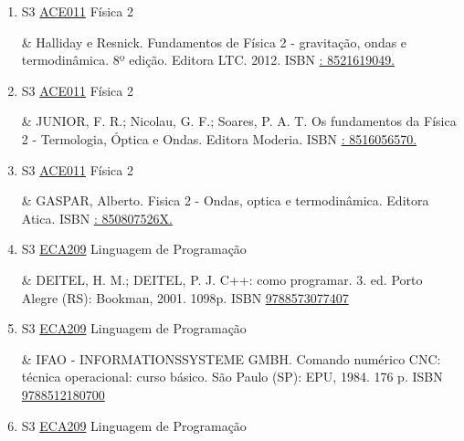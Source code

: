 \documentclass[12pt,a4paper]{book}
\begin{document}
\begin{enumerate}
&   TIPLER, Paul;  MOSCA, Gene.  Fisica para cientistas e Engenheiros.  Volume 2.  Editora LTC.  ISBN \href{http://www.google.com/search?hl=pt-BR&tbo=p&tbm=bks&q=isbn:: 8521617119.&num=10}{: 8521617119.}
 \item S3 \hyperref[PUD:ACE011]{ACE011} Física 2

&   Halliday e Resnick.  Fundamentos de Física 2 - gravitação, ondas e termodinâmica.  8º edição.  Editora LTC.  2012.  ISBN \href{http://www.google.com/search?hl=pt-BR&tbo=p&tbm=bks&q=isbn:: 8521619049.&num=10}{: 8521619049.} 

 

 \item S3 \hyperref[PUD:ACE011]{ACE011} Física 2

&   JUNIOR, F.  R.;  Nicolau, G.  F.;  Soares, P.  A.  T.  Os fundamentos da Física 2 - Termologia, Óptica e Ondas.  Editora Moderia.  ISBN \href{http://www.google.com/search?hl=pt-BR&tbo=p&tbm=bks&q=isbn:: 8516056570.&num=10}{: 8516056570.} 

 

 \item S3 \hyperref[PUD:ACE011]{ACE011} Física 2

&   GASPAR, Alberto.  Fisica 2 - Ondas, optica e termodinâmica.  Editora Atica.  ISBN \href{http://www.google.com/search?hl=pt-BR&tbo=p&tbm=bks&q=isbn:: 850807526X.&num=10}{: 850807526X.}
 \item S3 \hyperref[PUD:ECA209]{ECA209} Linguagem de Programação

&  DEITEL, H.  M.;  DEITEL, P.  J.  C++: como programar.  3. ed.  Porto Alegre (RS): Bookman, 2001.  1098p.  ISBN \href{http://www.bn.br/site/pages/servicosProfissionais/agenciaISBN/isbnBusca/FbnBuscaISBNCatalogo.asp?pField=ISBN&pIntPagina=1&pISBN=73077407&nidbISBN=true&hidbISBN=true}{9788573077407}

 

 \item S3 \hyperref[PUD:ECA209]{ECA209} Linguagem de Programação

&  IFAO - INFORMATIONSSYSTEME GMBH.  Comando numérico CNC: técnica operacional: curso básico.  São Paulo (SP): EPU, 1984.  176 p.  ISBN \href{http://www.bn.br/site/pages/servicosProfissionais/agenciaISBN/isbnBusca/FbnBuscaISBNCatalogo.asp?pField=ISBN&pIntPagina=1&pISBN=12180700&nidbISBN=true&hidbISBN=true}{9788512180700}

 

 \item S3 \hyperref[PUD:ECA209]{ECA209} Linguagem de Programação


\end{enumerate}
\end{document}
